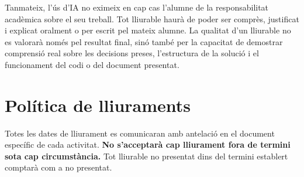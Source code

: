 Tanmateix, l'\'us d'IA no eximeix en cap cas l'alumne de la responsabilitat acad\`emica sobre el seu treball. Tot lliurable haur\`a de poder ser compr\`es, justificat i explicat oralment o per escrit pel mateix alumne. La qualitat d'un lliurable no es valorar\`a nom\'es pel resultat final, sin\'o tamb\'e per la capacitat de demostrar comprensi\'o real sobre les decisions preses, l'estructura de la soluci\'o i el funcionament del codi o del document presentat.

\section{Pol\'itica de lliuraments}

Totes les dates de lliurament es comunicaran amb antelaci\'o en el document espec\'ific de cada activitat. \textbf{No s'acceptar\`a cap lliurament fora de termini sota cap circumst\`ancia.} Tot lliurable no presentat dins del termini establert comptar\`a com a no presentat.

